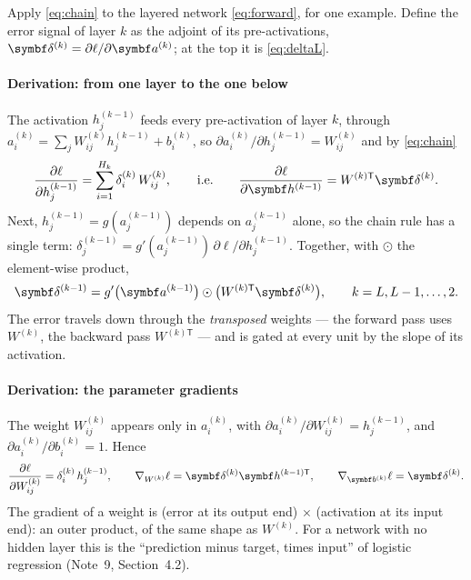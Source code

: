 \documentclass[11pt]{article}
\newcommand{\av}{\vect{a}}
\newcommand{\hv}{\vect{h}}
\newcommand{\bv}{\vect{b}}
\newcommand{\dv}{\vect{\delta}}
\begin{document}
Apply \eqref{eq:chain} to the layered network \eqref{eq:forward}, for one example. Define the error signal of layer
$k$ as the adjoint of its pre-activations, $\dv^{(k)} = \partial\ell/\partial\av^{(k)}$; at the top it is
\eqref{eq:deltaL}.

\paragraph{Derivation: from one layer to the one below} The activation $h^{(k-1)}_j$ feeds every pre-activation of
layer $k$, through $a^{(k)}_i = \sum_j W^{(k)}_{ij}h^{(k-1)}_j + b^{(k)}_i$, so $\partial a^{(k)}_i/\partial h^{(k-1)}_j =
W^{(k)}_{ij}$ and by \eqref{eq:chain}
\[
  \frac{\partial\ell}{\partial h^{(k-1)}_j} = \sum_{i=1}^{H_k} \delta^{(k)}_i\,W^{(k)}_{ij} ,
  \qquad\text{i.e.}\qquad
  \frac{\partial\ell}{\partial\hv^{(k-1)}} = W^{(k)\mathsf{T}}\dv^{(k)} .
\]
Next, $h^{(k-1)}_j = g(a^{(k-1)}_j)$ depends on $a^{(k-1)}_j$ alone, so the chain rule has a single term:
$\delta^{(k-1)}_j = g'(a^{(k-1)}_j)\,\partial\ell/\partial h^{(k-1)}_j$. Together, with $\odot$ the element-wise product,
\begin{equation}\label{eq:recursion}
  \dv^{(k-1)} = g'\big(\av^{(k-1)}\big) \odot \big(W^{(k)\mathsf{T}}\dv^{(k)}\big), \qquad k = L, L-1, \dots, 2 .
\end{equation}
The error travels down through the \emph{transposed} weights --- the forward pass uses $W^{(k)}$, the backward pass
$W^{(k)\mathsf{T}}$ --- and is gated at every unit by the slope of its activation.

\paragraph{Derivation: the parameter gradients} The weight $W^{(k)}_{ij}$ appears only in $a^{(k)}_i$, with
$\partial a^{(k)}_i/\partial W^{(k)}_{ij} = h^{(k-1)}_j$, and $\partial a^{(k)}_i/\partial b^{(k)}_i = 1$. Hence
\begin{equation}\label{eq:paramgrad}
  \frac{\partial\ell}{\partial W^{(k)}_{ij}} = \delta^{(k)}_i\,h^{(k-1)}_j , \qquad
  \nabla_{W^{(k)}}\ell = \dv^{(k)}\hv^{(k-1)\mathsf{T}} , \qquad \nabla_{\bv^{(k)}}\ell = \dv^{(k)} .
\end{equation}
The gradient of a weight is (error at its output end) $\times$ (activation at its input end): an outer product, of
the same shape as $W^{(k)}$. For a network with no hidden layer this is the ``prediction minus target, times input'' of
logistic regression (Note~9, Section~4.2).
\end{document}
